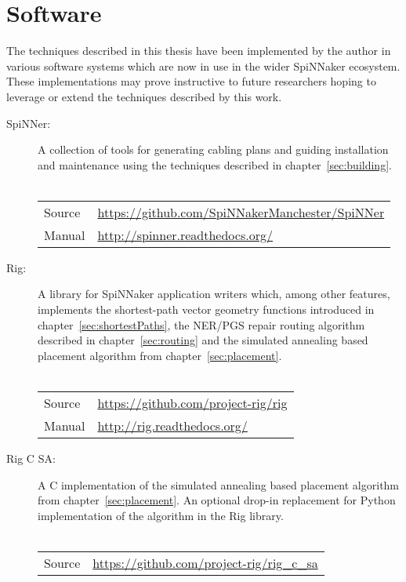 \chapter{Software}
	\label{sec:software}
	
	The techniques described in this thesis have been implemented by the author
	in various software systems which are now in use in the wider SpiNNaker
	ecosystem. These implementations may prove instructive to future researchers
	hoping to leverage or extend the techniques described by this work.
	
	\begin{description}
		
		\item [SpiNNer:] A collection of tools for generating cabling plans and
		guiding installation and maintenance using the techniques described in
		chapter~\ref{sec:building}.
		\\
		\vspace*{-1.25em}
		\\
		\begin{tabular}{ll}
			Source & \url{https://github.com/SpiNNakerManchester/SpiNNer} \\
			Manual & \url{http://spinner.readthedocs.org/} \\
		\end{tabular}
		
		\item [Rig:] A library for SpiNNaker application writers which, among other
		features, implements the shortest-path vector geometry functions introduced
		in chapter~\ref{sec:shortestPaths}, the NER/PGS repair routing algorithm
		described in chapter~\ref{sec:routing} and the simulated annealing based
		placement algorithm from chapter~\ref{sec:placement}.
		\\
		\vspace*{-1.25em}
		\\
		\begin{tabular}{ll}
			Source & \url{https://github.com/project-rig/rig} \\
			Manual & \url{http://rig.readthedocs.org/} \\
		\end{tabular}
		
		\item [Rig C SA:] A C implementation of the simulated annealing based
		placement algorithm from chapter~\ref{sec:placement}. An optional drop-in
		replacement for Python implementation of the algorithm in the Rig library.
		\\
		\vspace*{-1.25em}
		\\
		\begin{tabular}{ll}
			Source & \url{https://github.com/project-rig/rig_c_sa} \\
		\end{tabular}
		

\end{description}

